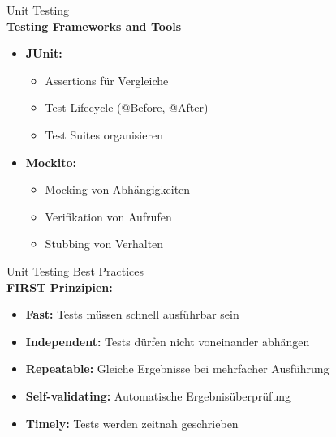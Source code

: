 \begin{KR}{Unit Testing}\\
\textbf{Testing Frameworks and Tools}
\begin{itemize}
   \item \textbf{JUnit:}
   \begin{itemize}
       \item Assertions für Vergleiche
       \item Test Lifecycle (@Before, @After)
       \item Test Suites organisieren
   \end{itemize}
   \item \textbf{Mockito:}
   \begin{itemize}
       \item Mocking von Abhängigkeiten
       \item Verifikation von Aufrufen
       \item Stubbing von Verhalten
   \end{itemize}
\end{itemize}
\end{KR}

\begin{corollary}{Unit Testing Best Practices}\\
\textbf{FIRST Prinzipien:}
\begin{itemize}
   \item \textbf{Fast:} Tests müssen schnell ausführbar sein
   \item \textbf{Independent:} Tests dürfen nicht voneinander abhängen
   \item \textbf{Repeatable:} Gleiche Ergebnisse bei mehrfacher Ausführung
   \item \textbf{Self-validating:} Automatische Ergebnisüberprüfung
   \item \textbf{Timely:} Tests werden zeitnah geschrieben
\end{itemize}
\end{corollary}



